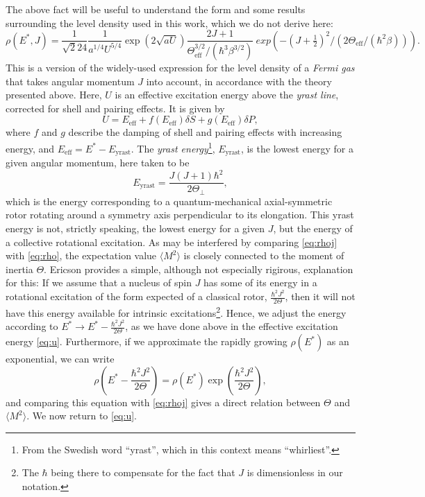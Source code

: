 The above fact will be useful to understand the form and some results surrounding the level density used in this work, which we do not derive here:
\begin{equation}
\rho(E^*,J) = \frac{1}{\sqrt{2}24}
\frac{1}{a^{1/4} U^{5/4}} \exp{(2\sqrt{aU})}
\frac{2J+1}{\Theta_\text{eff}^{3/2}/(\hbar^3\beta^{3/2})}\ exp{\left(-(J+\tfrac{1}{2})^2/(2\Theta_\text{eff}/(\hbar^2\beta))\right)}.\label{eq:rho}
\end{equation}
This is a version of the widely-used expression for the level density of a \emph{Fermi gas} that takes angular momentum $J$ into account, in accordance with the theory presented above\cite{ripl:2006}. 
Here, $U$ is an effective excitation energy above the \emph{yrast line}, corrected for shell and pairing effects. It is given by
\begin{equation}
U=E_\text{eff} + f(E_\text{eff})\delta S + g(E_\text{eff})\delta P,\label{eq:u}
\end{equation}
where $f$ and $g$ describe the damping of shell and pairing effects with increasing energy, and $E_\text{eff} = E^*-E_\text{yrast}$. The \emph{yrast energy}\footnote{From the Swedish word ``yrast'', which in this context means ``whirliest''\cite{yrast}.}, $E_\text{yrast}$, is the lowest energy for a given angular momentum, here taken to be
\begin{equation}
E_\text{yrast} = \frac{J(J+1)\hbar^2}{2\Theta_\perp},
\end{equation}
which is the energy corresponding to a quantum-mechanical axial-symmetric rotor rotating around a symmetry axis perpendicular to its elongation. This yrast energy is not, strictly speaking, the lowest energy for a given $J$, but the energy of a collective rotational excitation\cite{ericson:1960}.
As may be interfered by comparing \eqref{eq:rhoj} with \eqref{eq:rho}, the expectation value $\langle M^2 \rangle$ is closely connected to the moment of inertia $\Theta$.
Ericson\cite{ericson:1960} provides a simple, although not especially rigirous, explanation for this:
If we assume that a nucleus of spin $J$ has some of its energy in a rotational excitation of the form expected of a classical rotor, $\frac{\hbar^2J^2}{2\Theta}$, then it will not have this energy available for intrinsic excitations\footnote{The $\hbar$ being there to compensate for the fact that $J$ is dimensionless in our notation.}. Hence, we adjust the energy according to $E^* \to E^* - \frac{\hbar^2J^2}{2\Theta}$, as we have done above in the effective excitation energy \eqref{eq:u}. Furthermore, if we approximate the rapidly growing $\rho(E^*)$ as an exponential, we can write
\begin{equation}
\rho(E^* - \frac{\hbar^2J^2}{2\Theta}) = \rho(E^*) \exp{(\frac{\hbar^2J^2}{2\Theta})},
\end{equation}
and comparing this equation with \eqref{eq:rhoj} gives a direct relation between $\Theta$ and $\langle M^2 \rangle$. We now return to \autoref{eq:u}.
